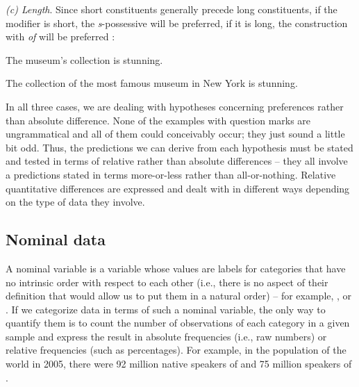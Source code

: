 \textit{(c) Length}. Since short constituents generally precede long constituents, if the modifier is short, the \textit{s}-possessive will be preferred, if it is long, the construction with \textit{of} will be preferred \citep{altenberg_binominal_1980}:

\begin{exe}
\ex
\begin{xlist} 
\label{ex:sgenlength}
\ex The museum's collection is stunning.
\end{xlist}
\end{exe}

\begin{exe}
\ex
\begin{xlist} 
\label{ex:ofclength}
\ex The collection of the most famous museum in New York is stunning.
\end{xlist}
\end{exe}

In all three cases, we are dealing with hypotheses concerning preferences rather than absolute difference. None of the examples with question marks are ungrammatical and all of them could conceivably occur; they just sound a little bit odd. Thus, the predictions we can derive from each hypothesis must be stated and tested in terms of relative rather than absolute differences -- they all involve a predictions stated in terms more-or-less rather than all-or-nothing. Relative quantitative differences are expressed and dealt with in different ways depending on the type of data they involve.

\subsection{Nominal data}
\label{sec:nominaldata}

A nominal variable is a variable whose values are labels for categories that have no intrinsic order with respect to each other (i.e., there is no aspect of their definition that would allow us to put them in a natural order) -- for example, ,  or . If we categorize data in terms of such a nominal variable, the only way to quantify them is to count the number of observations of each category in a given sample and express the result in absolute frequencies (i.e., raw numbers) or relative frequencies (such as percentages). For example, in the population of the world in 2005, there were 92 million native speakers of  and 75 million speakers of .

